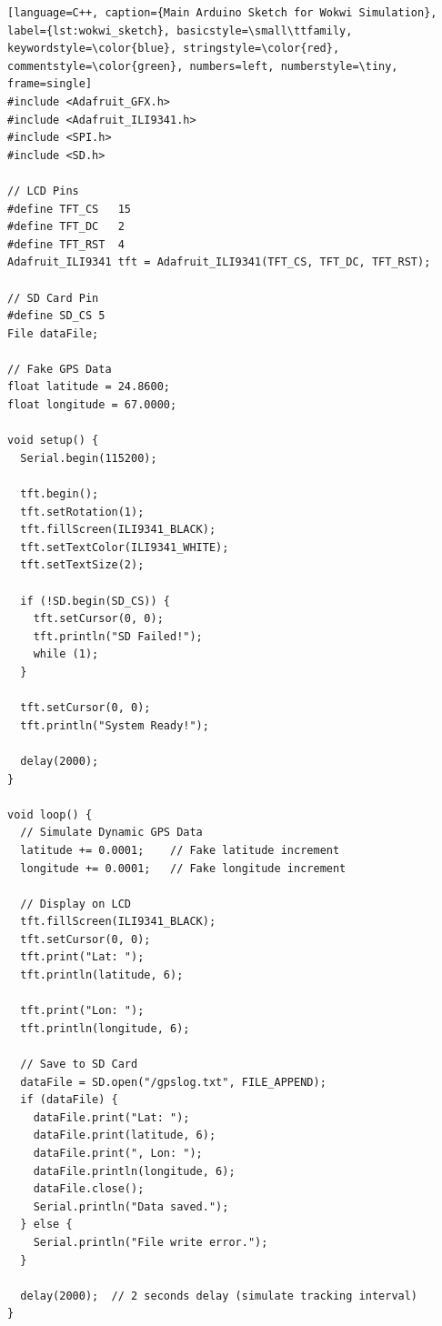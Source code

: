 \begin{lstlisting}[width=0.8\textwidth][language=C++, caption={Main Arduino Sketch for Wokwi Simulation}, label={lst:wokwi_sketch}, basicstyle=\small\ttfamily, keywordstyle=\color{blue}, stringstyle=\color{red}, commentstyle=\color{green}, numbers=left, numberstyle=\tiny, frame=single]
#include <Adafruit_GFX.h>
#include <Adafruit_ILI9341.h>
#include <SPI.h>
#include <SD.h>

// LCD Pins
#define TFT_CS   15
#define TFT_DC   2
#define TFT_RST  4
Adafruit_ILI9341 tft = Adafruit_ILI9341(TFT_CS, TFT_DC, TFT_RST);

// SD Card Pin
#define SD_CS 5
File dataFile;

// Fake GPS Data
float latitude = 24.8600;
float longitude = 67.0000;

void setup() {
  Serial.begin(115200);

  tft.begin();
  tft.setRotation(1);
  tft.fillScreen(ILI9341_BLACK);
  tft.setTextColor(ILI9341_WHITE);
  tft.setTextSize(2);

  if (!SD.begin(SD_CS)) {
    tft.setCursor(0, 0);
    tft.println("SD Failed!");
    while (1);
  }

  tft.setCursor(0, 0);
  tft.println("System Ready!");

  delay(2000);
}

void loop() {
  // Simulate Dynamic GPS Data
  latitude += 0.0001;    // Fake latitude increment
  longitude += 0.0001;   // Fake longitude increment

  // Display on LCD
  tft.fillScreen(ILI9341_BLACK);
  tft.setCursor(0, 0);
  tft.print("Lat: ");
  tft.println(latitude, 6);

  tft.print("Lon: ");
  tft.println(longitude, 6);

  // Save to SD Card
  dataFile = SD.open("/gpslog.txt", FILE_APPEND);
  if (dataFile) {
    dataFile.print("Lat: ");
    dataFile.print(latitude, 6);
    dataFile.print(", Lon: ");
    dataFile.println(longitude, 6);
    dataFile.close();
    Serial.println("Data saved.");
  } else {
    Serial.println("File write error.");
  }

  delay(2000);  // 2 seconds delay (simulate tracking interval)
}
\end{lstlisting}

